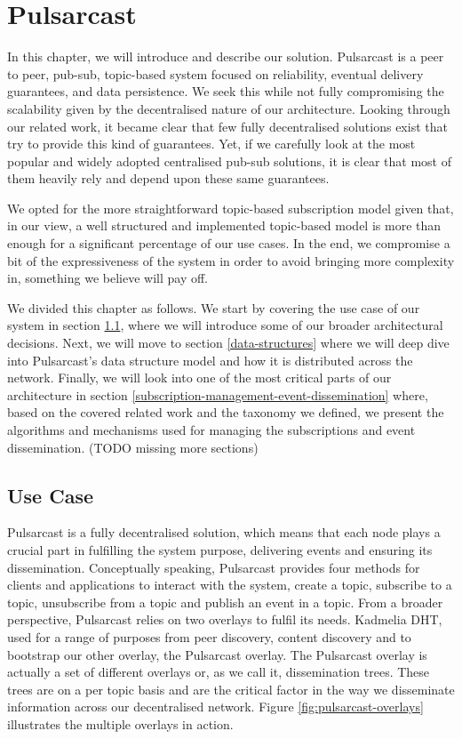 
\chapter{Pulsarcast}
\label{chapter:pulsarcast}

In this chapter, we will introduce and describe our solution. Pulsarcast is a
peer to peer, pub-sub, topic-based system focused on reliability, eventual
delivery guarantees, and data persistence. We seek this while not fully
compromising the scalability given by the decentralised nature of our
architecture. Looking through our related work, it became clear that few fully
decentralised solutions exist that try to provide this kind of guarantees. Yet,
if we carefully look at the most popular and widely adopted centralised pub-sub
solutions, it is clear that most of them heavily rely and depend upon these
same guarantees. 

We opted for the more straightforward topic-based subscription model given
that, in our view, a well structured and implemented topic-based model is more
than enough for a significant percentage of our use cases. In the end, we
compromise a bit of the expressiveness of the system in order to avoid bringing
more complexity in, something we believe will pay off.

We divided this chapter as follows. We start by covering the use case of our
system in section \ref{use-case}, where we will introduce some of our broader
architectural decisions. Next, we will move to section \ref{data-structures}
where we will deep dive into Pulsarcast's data structure model and how it is
distributed across the network. Finally, we will look into one of the most
critical parts of our architecture in section
\ref{subscription-management-event-dissemination} where, based on the covered
related work and the taxonomy we defined, we present the algorithms and
mechanisms used for managing the subscriptions and event dissemination. (TODO
missing more sections)

\section{Use Case}\label{use-case}

Pulsarcast is a fully decentralised solution, which means that each node plays
a crucial part in fulfilling the system purpose, delivering events and ensuring
its dissemination. Conceptually speaking, Pulsarcast provides four methods for
clients and applications to interact with the system, create a topic, subscribe
to a topic, unsubscribe from a topic and publish an event in a topic. From a
broader perspective, Pulsarcast relies on two overlays to fulfil its needs.
Kadmelia DHT, used for a range of purposes from peer discovery, content
discovery and to bootstrap our other overlay, the Pulsarcast overlay. The
Pulsarcast overlay is actually a set of different overlays or, as we call it,
dissemination trees.  These trees are on a per topic basis and are the critical
factor in the way we disseminate information across our decentralised network.
Figure \ref{fig:pulsarcast-overlays} illustrates the multiple overlays in
action.

